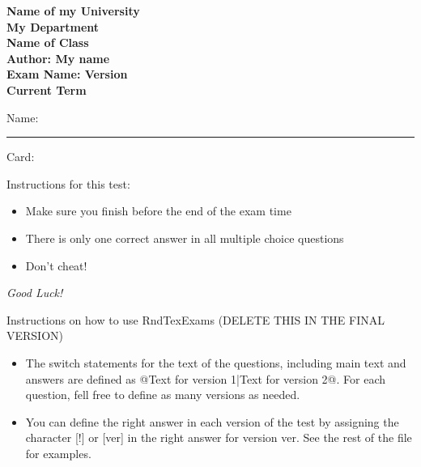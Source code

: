 \documentclass[10pt]{examdesign}
\newcommand{\myversion}{} %
\begin{document}
\begin{examtop}

\begin{center}
    \textbf{\Large  Name of my University} \\
    \textbf{\Large  My Department} \vspace{0.5cm}  \\
    \textbf{\Large  Name of Class} \\
	\textbf{\Large  Author: My name} \\
    \textbf{\Large Exam Name: Version \myversion } \\
    \textbf{\Large Current Term}
 \end{center}

\vspace{1cm}
Name: \rule{4in}{.4pt}  \quad  \noindent Card:\enspace\hrulefill


\vspace{1cm}

\small

\begin{framed}

Instructions for this test:

\begin{itemize}

	\item Make sure you finish before the end of the exam time

	\item There is only one correct answer in all multiple choice questions

	\item Don't cheat!

\end{itemize}

\vspace{0.5cm}

{\large \emph{Good Luck!}}
\end{framed}

\begin{framed}
	Instructions on how to use RndTexExams (DELETE THIS IN THE FINAL VERSION)
	\begin{itemize}

		\item The switch statements for the text of the questions, including main text and answers are defined as @{Text for version 1}|{Text for version 2}@. For each question, fell free to define as many versions as needed.

		\item You can define the right answer in each version of the test by assigning the character [!] or [ver] in the right answer for version ver. See the rest of the file for examples.


	\end{itemize}

\end{framed}

\end{examtop}
\end{document}
